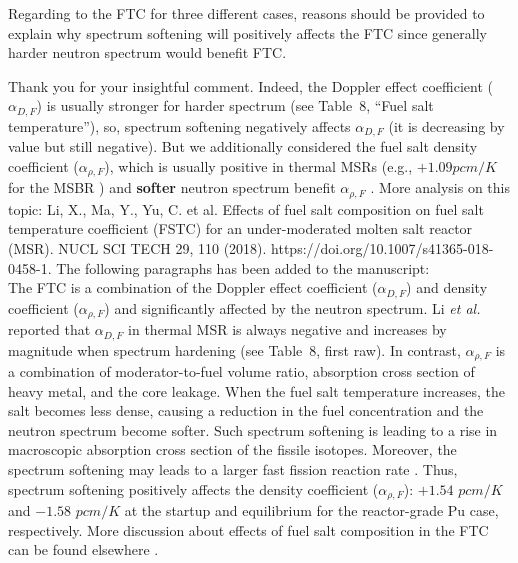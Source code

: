 \documentclass[answers,11pt]{exam}
\begin{document}
\begin{questions}
        \question Regarding to the FTC for three different cases, reasons should be provided to explain why spectrum softening will positively affects the FTC since generally harder neutron spectrum would benefit FTC.
        \begin{solution}
                Thank you for your insightful comment.  Indeed, the Doppler 
                effect coefficient ($\alpha_{D,F}$) is usually stronger for 
                harder spectrum (see Table~8, ``Fuel salt temperature''), so, 
                spectrum softening negatively affects $\alpha_{D,F}$ (it is 
                decreasing by value but still negative). But we additionally 
                considered the fuel salt density coefficient 
                ($\alpha_{\rho,F}$), which is usually positive in thermal MSRs 
                (e.g., $+1.09pcm/K$ for the \gls{MSBR}           
                \cite{robertson_conceptual_1971}) and \textbf{softer} neutron 
                spectrum benefit $\alpha_{\rho,F}$ \cite{li_effects_2018-1, 
                rykhlevskii2019modeling}. More analysis on this topic:
            Li, X., Ma, Y., Yu, C. et al. Effects of fuel salt composition on 
            fuel salt temperature coefficient (FSTC) for an under-moderated 
            molten salt reactor (MSR). NUCL SCI TECH 29, 110 (2018). 
            https://doi.org/10.1007/s41365-018-0458-1.     
	            The following paragraphs has been added to the manuscript:\\

	            The \gls{FTC} is a combination of the Doppler effect 
	            coefficient 
	            ($\alpha_{D,F}$) and density coefficient ($\alpha_{\rho,F}$) 
	            and significantly 
	            affected by the neutron spectrum. Li \emph{et al.} reported 
	            that 
	            $\alpha_{D,F}$ in thermal \gls{MSR} is always negative and 
	            increases by 
	            magnitude when spectrum hardening (see Table~8, first raw). 
	            In contrast, $\alpha_{\rho,F}$ is a combination of 
	            moderator-to-fuel volume 
	            ratio, absorption cross section of heavy metal, and the core 
	            leakage. When the 
	            fuel salt temperature increases, the salt becomes less dense, 
	            causing a 
	            reduction in the fuel concentration and the neutron spectrum 
	            become softer. 
	            Such spectrum softening is leading to a rise in macroscopic 
	            absorption cross 
	            section of the fissile isotopes. Moreover, the spectrum 
	            softening may leads to 
	            a larger fast fission reaction rate \cite{li_effects_2018-1}. 
	            Thus, spectrum 
	            softening positively affects the density coefficient 
	            ($\alpha_{\rho,F}$): 
	            $+1.54$ $pcm/K$ and $-1.58$ $pcm/K$ at the startup and 
	            equilibrium for the 
	            reactor-grade Pu case, respectively. More discussion about 
	            effects of fuel 
	            salt composition in the \gls{FTC} can be found elsewhere 
	            \cite{li_effects_2018-1}.
        \end{solution}


\end{questions}
\end{document}
